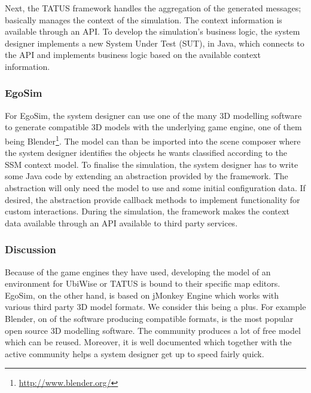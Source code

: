 Next, the TATUS framework handles the aggregation of the generated messages; basically manages the context of the simulation. The context information is available through an API. To develop the simulation's business logic, the system designer implements a new System Under Test (SUT), in Java, which connects to the API and implements business logic based on the available context information.\\

\subsubsection{EgoSim} %
For EgoSim, the system designer can use one of the many 3D modelling software to generate compatible 3D models with the underlying game engine, one of them being Blender\footnote{\url{http://www.blender.org/}}. The model can than be imported into the scene composer where the system designer identifies the objects he wants classified according to the SSM context model. To finalise the simulation, the system designer has to write some Java code by extending an abstraction provided by the framework. The abstraction will only need the model to use and some initial configuration data. If desired, the abstraction provide callback methods to implement functionality for custom interactions. During the simulation, the framework makes the context data available through an API available to third party services.\\

\subsubsection{Discussion} %
Because of the game engines they have used, developing the model of an environment for UbiWise or TATUS is bound to their specific map editors. EgoSim, on the other hand, is based on jMonkey Engine which works with various third party 3D model formats. We consider this being a plus. For example Blender, on of the software producing compatible formats, is the most popular open source 3D modelling software. The community produces a lot of free model which can be reused. Moreover, it is well documented which together with the active community helps a system designer get up to speed fairly quick.\\


